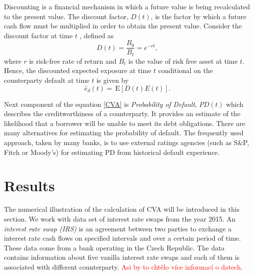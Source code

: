 \documentclass{amsart}
\theoremstyle{definition}\newtheorem{definition}[theorem]{Definition}
\theoremstyle{remark}\newtheorem{remark}[theorem]{Remark}
\newcommand{\E}{\,\mathrm{E}}
\begin{document}
Discounting is a financial mechanism in which a future value is being recalculated to the present value.
The discount factor, $D(t)$, is the factor by which a future cash flow must be multiplied in order to obtain the present value.
Consider the discount factor at time $t$%
, defined as 
\begin{equation}
D(t)=\frac{B_0}{B_t}=e^{-rt},
\end{equation}
where $r$ is risk-free rate of return and $B_t$ is the value of risk free asset at time $t$. 
Hence, the discounted expected exposure at time $t$ conditional on the counterparty default at time $t$ is given by 
\begin{equation}
\hat{e}_d(t)=\E[D(t) E(t)].
\end{equation}

Next component of the equation \eqref{CVA} is \textit{Probability of Default}, $PD(t)$ which describes the creditworthiness of a counterparty. 
It provides an estimate of the likelihood that a borrower will be unable to meet its debt obligations.
There are many alternatives for estimating the probability of default.
The frequently used approach, taken by many banks, is to use external ratings agencies (such as S\&P, Fitch or Moody's) for estimating PD from historical default experience.


\section{Results}
The numerical illustration of the calculation of CVA will be introduced in this section. 
We work with data set of interest rate swaps from the year 2015.
An \textit{interest rate swap (IRS)} is an agreement between two parties to exchange a interest rate cash flows on specified intervals and over a certain period of time. 
These data come from a bank operating in the Czech Republic. 
The data contains information about five vanilla interest rate swaps and each of them is associated with different counterparty. \textcolor{red}{Asi by to chtělo více informací o datech.}

\begin{table}[!htbp]
\centering
\caption{Variables in a data set}  \label{variable}
\end{table}
\end{document}
